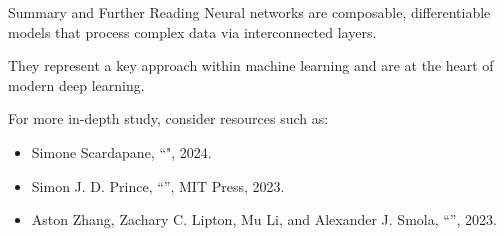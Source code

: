 \documentclass[xcolor=x11names,compress,10pt,unknownkeysallowed,aspectratio=169]{beamer}
\begin{document}



%
\begin{frame}{Summary and Further Reading}
Neural networks are \alert{composable}, \alert{differentiable} models that process \alert{complex data} via interconnected layers.

\vspace{0.6cm}
They represent a \alert{key approach} within machine learning and are at the heart of modern deep learning.

\vspace{0.6cm}
For more \alert{in-depth study}, consider resources such as:
\vspace{0.1cm}
\begin{itemize}\justifying
    \item {\small{Simone Scardapane, ``", 2024.}}
    \item {\small{Simon J. D. Prince, ``'', MIT Press, 2023.}}
    \item {\small{Aston Zhang, Zachary C. Lipton, Mu Li, and Alexander J. Smola, ``'', 2023.}}
\end{itemize}
\end{frame}
%
\end{document}
